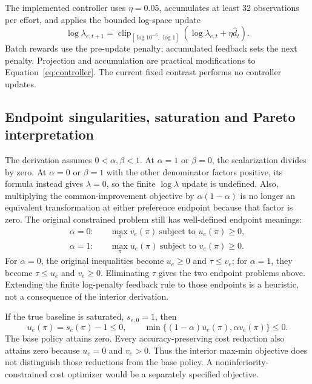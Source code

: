 \documentclass[11pt]{article}
\begin{document}
The implemented controller uses $\eta=0.05$, accumulates at least 32 observations per effort, and applies the bounded log-space update
\begin{equation}
 \log\lambda_{e,t+1}=\operatorname{clip}_{[\log10^{-6},\,\log1]}
                (\log\lambda_{e,t}+\eta\widehat d_t).
 \label{eq:clippedcontroller}
\end{equation}
Batch rewards use the pre-update penalty; accumulated feedback sets the next penalty. Projection and accumulation are practical modifications to Equation~\eqref{eq:controller}. The current fixed contrast performs no controller updates.

\subsection{Endpoint singularities, saturation and Pareto interpretation}

The derivation assumes $0<\alpha,\beta<1$. At $\alpha=1$ or $\beta=0$, the scalarization divides by zero. At $\alpha=0$ or $\beta=1$ with the other denominator factors positive, its formula instead gives $\lambda=0$, so the finite $\log\lambda$ update is undefined. Also, multiplying the common-improvement objective by $\alpha(1-\alpha)$ is no longer an equivalent transformation at either preference endpoint because that factor is zero. The original constrained problem still has well-defined endpoint meanings:
\begin{align}
 \alpha=0:&\quad\max_\pi v_e(\pi)\ \text{subject to }u_e(\pi)\geq0,\\
 \alpha=1:&\quad\max_\pi u_e(\pi)\ \text{subject to }v_e(\pi)\geq0.
\end{align}
For $\alpha=0$, the original inequalities become $u_e\geq0$ and $\tau\leq v_e$; for $\alpha=1$, they become $\tau\leq u_e$ and $v_e\geq0$. Eliminating $\tau$ gives the two endpoint problems above. Extending the finite log-penalty feedback rule to those endpoints is a heuristic, not a consequence of the interior derivation.

If the true baseline is saturated, $s_{e,0}=1$, then
\begin{equation}
 u_e(\pi)=s_e(\pi)-1\leq0,
 \qquad\min\{(1-\alpha)u_e(\pi),\alpha v_e(\pi)\}\leq0.
\end{equation}
The base policy attains zero. Every accuracy-preserving cost reduction also attains zero because $u_e=0$ and $v_e>0$. Thus the interior max-min objective does not distinguish those reductions from the base policy. A noninferiority-constrained cost optimizer would be a separately specified objective.
\end{document}
